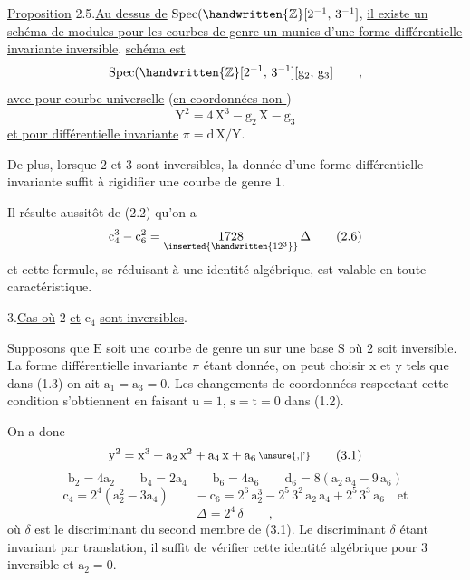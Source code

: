 \uline{Proposition} 2.5.\quad \uline{Au dessus de} $\operatorname{Spec}(\handwritten{\mathbb{Z}}[2^{-1},\,3^{-1}]$, \uline{il existe un schéma de modules pour les courbes de genre un munies d'une forme différentielle invariante inversible}. \uline{ schéma est}
\[
\operatorname{Spec}(\handwritten{\mathbb{Z}}[2^{-1},\,3^{-1}][\mathrm{g}_{2},\,\mathrm{g}_{3}]\qquad,
\]
\clearpage
\uline{avec pour courbe universelle} (\uline{en coordonnées non })
\[
\mathrm{Y}^{2}=4\,\mathrm{X}^{3}-\mathrm{g}_{2}\,\mathrm{X}-\mathrm{g}_{3}
\]
\uline{et pour différentielle invariante} $\pi=\mathrm{d}\,\mathrm{X}/\mathrm{Y}$.

De plus, lorsque $2$ et $3$ sont inversibles, la donnée d'une forme différentielle invariante suffit à rigidifier une courbe de genre $1$.

Il résulte aussitôt de (2.2) qu'on a
\[
\mathrm{c}_{4}^{3}-\mathrm{c}_{6}^{2}=\underset{\inserted{\handwritten{12^{3}}}}{1728}\,\Delta
\tag*{(2.6)}
\]
et cette formule, se réduisant à une identité algébrique, est valable en toute caractéristique.

3.\qquad \uline{Cas où} $2$ \uline{et} $\mathrm{c}_{4}$ \uline{sont inversibles}.

Supposons que $\mathrm{E}$ soit une courbe de genre un sur une base $\mathrm{S}$ où $2$ soit inversible. La forme différentielle invariante $\pi$ étant donnée, on peut choisir $\mathrm{x}$ et $\mathrm{y}$ tels que dans (1.3) on ait $\mathrm{a}_{1}=\mathrm{a}_{3}=0$. Les changements de coordonnées respectant cette condition s'obtiennent en faisant $\mathrm{u}=1$, $\mathrm{s}=\mathrm{t}=0$ dans (1.2).

On a donc
\[
\mathrm{y}^{2}=\mathrm{x}^{3}+\mathrm{a}_{2}\,\mathrm{x}^{2}+\mathrm{a}_{4}\,\mathrm{x}+\mathrm{a}_{6}\,\raisebox{.14ex}{\scriptsize\unsure{,|'}}
\tag*{(3.1)}
\]
\[
\mathrm{b}_{2}=4\mathrm{a}_{2}\qquad\mathrm{b}_{4}=2\mathrm{a}_{4}\qquad
\mathrm{b}_{6}=4\mathrm{a}_{6}\qquad\mathrm{d}_{6}=8(\mathrm{a}_{2}\,\mathrm{a}_{4}-9\,\mathrm{a}_{6})
\]
\[
\mathrm{c}_{4}=2^{4}(\mathrm{a}_{2}^{2}-3\mathrm{a}_{4})\qquad
-\mathrm{c}_{6}=2^{6}\,\mathrm{a}_{2}^{3}-2^{5}\,3^{2}\,\mathrm{a}_{2}\,\mathrm{a}_{4}+2^{5}\,3^{3}\,\mathrm{a}_{6}\quad\text{et}
\tag*{(3.2)}
\]
\[
\Delta=2^{4}\,\delta\qquad,
\]
\clearpage
où $\delta$ est le discriminant du second membre de (3.1). Le discriminant $\delta$ étant invariant par translation, il suffit de vérifier cette identité algébrique pour $3$ inversible et $\mathrm{a}_{2}=0$.

